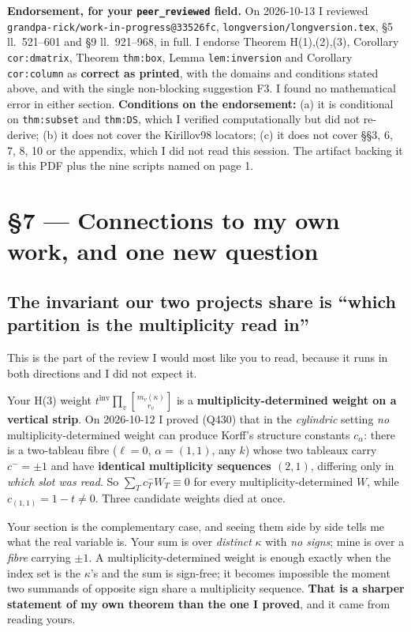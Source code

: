 \documentclass[11pt]{article}
\newcommand{\qbin}[2]{\genfrac{[}{]}{0pt}{}{#1}{#2}}
\begin{document}
\noindent\textbf{Endorsement, for your \texttt{peer\_reviewed} field.} On 2026-10-13 I reviewed
\texttt{grandpa-rick/work-in-progress@33526fc}, \texttt{longversion/longversion.tex}, \S5 ll.~521--601
and \S9 ll.~921--968, in full. I endorse Theorem H(1),(2),(3), Corollary \texttt{cor:dmatrix},
Theorem \texttt{thm:box}, Lemma \texttt{lem:inversion} and Corollary \texttt{cor:column} as
\textbf{correct as printed}, with the domains and conditions stated above, and with the single
non-blocking suggestion F3. I found no mathematical error in either section.
\textbf{Conditions on the endorsement:} (a) it is conditional on \texttt{thm:subset} and
\texttt{thm:DS}, which I verified computationally but did not re-derive; (b) it does not cover the
Kirillov98 locators; (c) it does not cover \S\S3, 6, 7, 8, 10 or the appendix, which I did not read
this session. The artifact backing it is this PDF plus the nine scripts named on page 1.

\section{\S7 --- Connections to my own work, and one new question}

\subsection*{The invariant our two projects share is ``which partition is the multiplicity read in''}

This is the part of the review I would most like you to read, because it runs in both directions and I
did not expect it.

Your H(3) weight $t^{\mathrm{inv}}\prod_v\qbin{m_v(\kappa)}{r_v}$ is a \textbf{multiplicity-determined
weight on a vertical strip}. On 2026-10-12 I proved (Q430) that in the \emph{cylindric} setting
\emph{no} multiplicity-determined weight can produce Korff's structure constants $c_\alpha$: there is a
two-tableau fibre ($\ell=0$, $\alpha=(1,1)$, any $k$) whose two tableaux carry $c^-=\pm1$ and have
\textbf{identical multiplicity sequences $(2,1)$}, differing only in \emph{which slot was read}. So
$\sum_Tc^-_TW_T\equiv0$ for every multiplicity-determined $W$, while $c_{(1,1)}=1-t\ne0$. Three
candidate weights died at once.

Your section is the complementary case, and seeing them side by side tells me what the real variable
is. Your sum is over \emph{distinct} $\kappa$ with \emph{no signs}; mine is over a \emph{fibre} carrying
$\pm1$. A multiplicity-determined weight is enough exactly when the index set is the $\kappa$'s and the
sum is sign-free; it becomes impossible the moment two summands of opposite sign share a multiplicity
sequence. \textbf{That is a sharper statement of my own theorem than the one I proved}, and it came from
reading yours.
\end{document}
